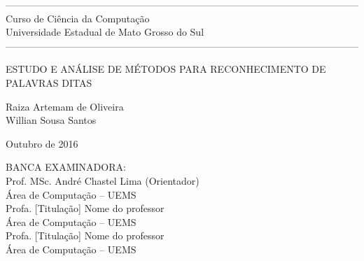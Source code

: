 \thispagestyle{plain}
\begin{center}

------------------------------------------------------------------------------------------------------------
\normalsize{Curso de Ciência da Computação \\ Universidade Estadual de Mato Grosso do Sul}
------------------------------------------------------------------------------------------------------------

\vspace*{2cm}

\LARGE{ESTUDO E ANÁLISE DE MÉTODOS PARA RECONHECIMENTO DE PALAVRAS DITAS}


\vspace*{1.5cm}
\normalsize{Raiza Artemam de Oliveira \\ Willian Sousa Santos}

\vspace*{1.5cm}

\normalsize{Outubro de 2016}

\vspace*{3cm}
\end{center}
\begin{flushleft}
\begin{minipage}{0.5\textwidth}
\normalsize{
BANCA EXAMINADORA:\\


Prof. MSc. André Chastel Lima (Orientador) \\
Área de Computação – UEMS\\



Profa. [Titulação]  Nome do professor \\
 Área de Computação – UEMS\\


 Profa. [Titulação] Nome do professor \\
 Área de Computação – UEMS 
}
\end{minipage}
\end{flushleft}

